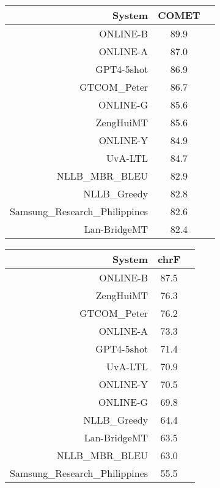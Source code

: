 \documentclass[11pt]{article}
\begin{document}
\begin{table}  
\scriptsize
\begin{subtable}[t]{0.33\textwidth}
\begin{tabular}{rcc}
\toprule 
System  & COMET \\ 
\midrule 
\rowcolor{ashgrey} ONLINE-B  & 89.9 \\ 
\rowcolor{ashgrey} ONLINE-A  & 87.0 \\ 
\rowcolor{ashgrey} GPT4-5shot  & 86.9 \\ 
\rowcolor{ashgrey} GTCOM\_Peter  & 86.7 \\ 
\rowcolor{ashgrey} ONLINE-G  & 85.6 \\ 
\rowcolor{ashgrey} ZengHuiMT  & 85.6 \\ 
\rowcolor{ashgrey} ONLINE-Y  & 84.9 \\ 
UvA-LTL &  84.7 \\ 
\rowcolor{ashgrey} NLLB\_MBR\_BLEU  & 82.9 \\ 
\rowcolor{ashgrey} NLLB\_Greedy  & 82.8 \\ 
Samsung\_Research\_Philippines  & 82.6 \\ 
\rowcolor{ashgrey} Lan-BridgeMT  & 82.4 \\ 
\bottomrule 
\end{tabular} 
\end{subtable}
\begin{subtable}[t]{0.33\textwidth}
\begin{tabular}{rcc}
\toprule 
System  & chrF \\ 
\midrule 
\rowcolor{ashgrey} ONLINE-B  & 87.5 \\ 
\rowcolor{ashgrey} ZengHuiMT  & 76.3 \\ 
\rowcolor{ashgrey} GTCOM\_Peter  & 76.2 \\ 
\rowcolor{ashgrey} ONLINE-A  & 73.3 \\ 
\rowcolor{ashgrey} GPT4-5shot  & 71.4 \\ 
UvA-LTL  & 70.9 \\ 
\rowcolor{ashgrey} ONLINE-Y  & 70.5 \\ 
\rowcolor{ashgrey} ONLINE-G  & 69.8 \\ 
\rowcolor{ashgrey} NLLB\_Greedy  & 64.4 \\ 
\rowcolor{ashgrey} Lan-BridgeMT  & 63.5 \\ 
\rowcolor{ashgrey} NLLB\_MBR\_BLEU  & 63.0 \\ 
Samsung\_Research\_Philippines  & 55.5 \\ 
\bottomrule 

\end{tabular}
\end{subtable}
\end{table}
\end{document}
